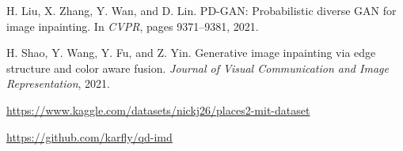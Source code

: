 \begin{thebibliography}{10}
H. Liu, X. Zhang, Y. Wan, and D. Lin.  
PD-GAN: Probabilistic diverse GAN for image inpainting.  
In \textit{CVPR}, pages 9371–9381, 2021.

H. Shao, Y. Wang, Y. Fu, and Z. Yin.  
Generative image inpainting via edge structure and color aware fusion.  
\textit{Journal of Visual Communication and Image Representation}, 2021.

\url{https://www.kaggle.com/datasets/nickj26/places2-mit-dataset}

\url{https://github.com/karfly/qd-imd}

\end{thebibliography}
